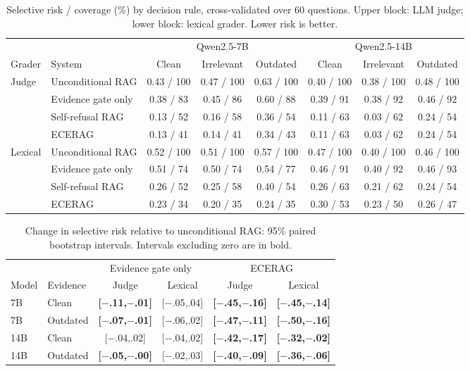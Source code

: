 \documentclass[conference,letterpaper]{IEEEtran}
\begin{document}
\begin{table}[t]
\caption{Selective risk / coverage (\%) by decision rule, cross-validated over 60 questions.
Upper block: LLM judge; lower block: lexical grader. Lower risk is better.}
\label{tab:decomp}
\centering
\begin{tabular}{llcccccc}
\toprule
& & \multicolumn{3}{c}{Qwen2.5-7B} & \multicolumn{3}{c}{Qwen2.5-14B}\\
\cmidrule(lr){3-5}\cmidrule(lr){6-8}
Grader & System & Clean & Irrelevant & Outdated & Clean & Irrelevant & Outdated\\
\midrule
\multirow{4}{*}{Judge}
& Unconditional RAG      & 0.43 / 100 & 0.47 / 100 & 0.63 / 100 & 0.40 / 100 & 0.38 / 100 & 0.48 / 100\\
& Evidence gate only     & 0.38 / 83  & 0.45 / 86  & 0.60 / 88  & 0.39 / 91  & 0.38 / 92  & 0.46 / 92\\
& Self-refusal RAG       & 0.13 / 52  & 0.16 / 58  & 0.36 / 54  & 0.11 / 63  & 0.03 / 62  & 0.24 / 54\\
& ECERAG                 & 0.13 / 41  & 0.14 / 41  & 0.34 / 43  & 0.11 / 63  & 0.03 / 62  & 0.24 / 54\\
\midrule
\multirow{4}{*}{Lexical}
& Unconditional RAG      & 0.52 / 100 & 0.51 / 100 & 0.57 / 100 & 0.47 / 100 & 0.40 / 100 & 0.46 / 100\\
& Evidence gate only     & 0.51 / 74  & 0.50 / 74  & 0.54 / 77  & 0.46 / 91  & 0.40 / 92  & 0.46 / 93\\
& Self-refusal RAG       & 0.26 / 52  & 0.25 / 58  & 0.40 / 54  & 0.26 / 63  & 0.21 / 62  & 0.24 / 54\\
& ECERAG                 & 0.23 / 34  & 0.20 / 35  & 0.24 / 35  & 0.30 / 53  & 0.23 / 50  & 0.26 / 47\\
\bottomrule
\end{tabular}
\end{table}

\begin{table}[t]
\caption{Change in selective risk relative to unconditional RAG: 95\% paired bootstrap
intervals. Intervals excluding zero are in bold.}
\label{tab:ci}
\centering
\footnotesize
\setlength{\tabcolsep}{2.6pt}
\begin{tabular}{llcccc}
\toprule
& & \multicolumn{2}{c}{Evidence gate only} & \multicolumn{2}{c}{ECERAG}\\
\cmidrule(lr){3-4}\cmidrule(lr){5-6}
Model & Evidence & Judge & Lexical & Judge & Lexical\\
\midrule
7B  & Clean    & \textbf{[$-$.11,$-$.01]} & [$-$.05,.04] & \textbf{[$-$.45,$-$.16]} & \textbf{[$-$.45,$-$.14]}\\
7B  & Outdated & \textbf{[$-$.07,$-$.01]} & [$-$.06,.02] & \textbf{[$-$.47,$-$.11]} & \textbf{[$-$.50,$-$.16]}\\
14B & Clean    & [$-$.04,.02] & [$-$.04,.02] & \textbf{[$-$.42,$-$.17]} & \textbf{[$-$.32,$-$.02]}\\
14B & Outdated & \textbf{[$-$.05,$-$.00]} & [$-$.02,.03] & \textbf{[$-$.40,$-$.09]} & \textbf{[$-$.36,$-$.06]}\\
\bottomrule
\end{tabular}
\end{table}
\end{document}
